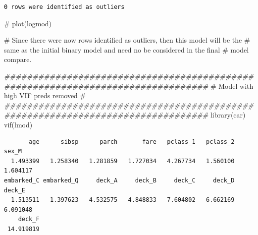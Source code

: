 \documentclass[
  letterpaper,
  DIV=11,
  numbers=noendperiod]{scrartcl}
\newenvironment{Shaded}{\begin{snugshade}}{\end{snugshade}}
\newcommand{\AttributeTok}[1]{\textcolor[rgb]{0.40,0.45,0.13}{#1}}
\newcommand{\CommentTok}[1]{\textcolor[rgb]{0.37,0.37,0.37}{#1}}
\newcommand{\DocumentationTok}[1]{\textcolor[rgb]{0.37,0.37,0.37}{\textit{#1}}}
\newcommand{\FunctionTok}[1]{\textcolor[rgb]{0.28,0.35,0.67}{#1}}
\newcommand{\NormalTok}[1]{\textcolor[rgb]{0.00,0.23,0.31}{#1}}
\newcommand{\OtherTok}[1]{\textcolor[rgb]{0.00,0.23,0.31}{#1}}
\newcommand{\SpecialCharTok}[1]{\textcolor[rgb]{0.37,0.37,0.37}{#1}}
\newcommand{\StringTok}[1]{\textcolor[rgb]{0.13,0.47,0.30}{#1}}
\begin{document}
\begin{Shaded}
\end{Shaded}

\begin{verbatim}
0 rows were identified as outliers
\end{verbatim}

\begin{Shaded}
\begin{Highlighting}[]
\CommentTok{\# plot(logmod)}

\CommentTok{\# Since there were now rows identified as outliers, then this model will be the }
\CommentTok{\# same as the initial binary model and need no be considered in the final }
\CommentTok{\# model compare.}

\DocumentationTok{\#\#\#\#\#\#\#\#\#\#\#\#\#\#\#\#\#\#\#\#\#\#\#\#\#\#\#\#\#\#\#\#\#\#\#\#\#\#\#\#\#\#\#\#\#\#\#\#\#\#\#\#\#\#\#\#\#\#\#\#\#\#\#\#\#\#\#\#\#\#\#\#\#\#\#\#\#\#\#\#}
\CommentTok{\#                Model with high VIF preds removed                             \# }
\DocumentationTok{\#\#\#\#\#\#\#\#\#\#\#\#\#\#\#\#\#\#\#\#\#\#\#\#\#\#\#\#\#\#\#\#\#\#\#\#\#\#\#\#\#\#\#\#\#\#\#\#\#\#\#\#\#\#\#\#\#\#\#\#\#\#\#\#\#\#\#\#\#\#\#\#\#\#\#\#\#\#\#\#}
\FunctionTok{library}\NormalTok{(car)}
\FunctionTok{vif}\NormalTok{(lmod)}
\end{Highlighting}
\end{Shaded}

\begin{verbatim}
       age      sibsp      parch       fare   pclass_1   pclass_2      sex_M 
  1.493399   1.258340   1.281859   1.727034   4.267734   1.560100   1.604117 
embarked_C embarked_Q     deck_A     deck_B     deck_C     deck_D     deck_E 
  1.513511   1.397623   4.532575   4.848833   7.604802   6.662169   6.091048 
    deck_F 
 14.919819 
\end{verbatim}
\end{document}
